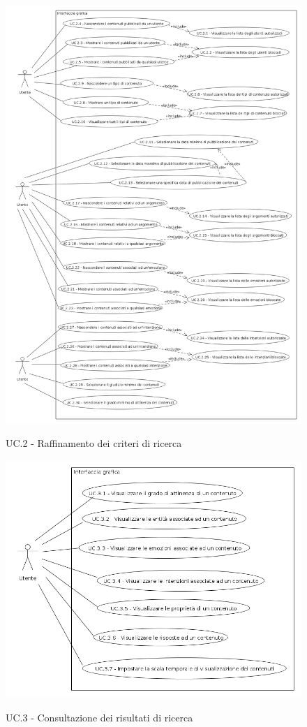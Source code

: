 \begin{figure}[ht]
	\begin{center}
    	\includegraphics[width=12cm]{img/uc_2.png}
		\label{gfx:uc:2}
		\caption{UC.2 - Raffinamento dei criteri di ricerca}
	\end{center}
\end{figure}

\begin{figure}[ht]
	\begin{center}
    	\includegraphics[width=12cm]{img/uc_3.png}
		\label{gfx:uc:3}
		\caption{UC.3 - Consultazione dei risultati di ricerca}
	\end{center}
\end{figure}

